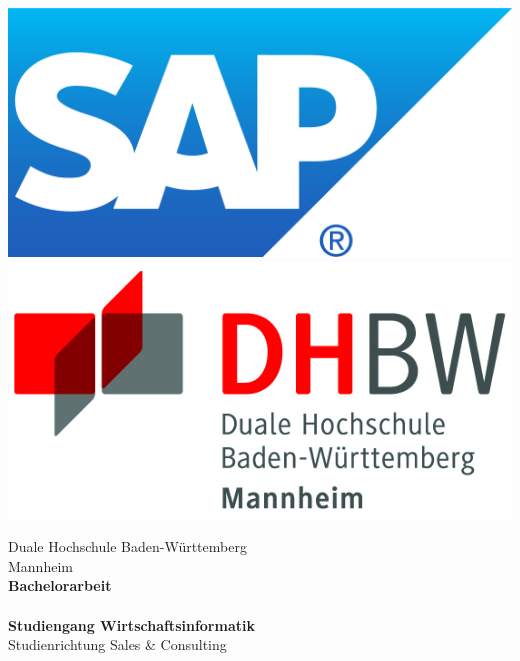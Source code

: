 \begin{titlepage}
\begin{minipage}{\textwidth}
		\vspace{-2cm}
		\noindent \includegraphics[scale=0.275]{img/SAP_R_grad.jpg} \hfill   \includegraphics{img/logo.jpg}
\end{minipage}
\vspace{1em}
\sffamily
\begin{center}
	\textsf{\large{}Duale Hochschule Baden-W\"urttemberg\\[1.5mm] Mannheim}\\[2em]
	\textsf{\textbf{\Large{}Bachelorarbeit}}\\[3mm]
	\textsf{\textbf{\DerTitelDerArbeit}} \\[1.5cm]
	\textsf{\textbf{\Large{}Studiengang Wirtschaftsinformatik}\\[3mm] \textsf{Studienrichtung Sales \& Consulting}}
	
	\vspace{3em}
\vfill

\begin{minipage}{\textwidth}


\end{minipage}
\end{center}
\end{titlepage}

